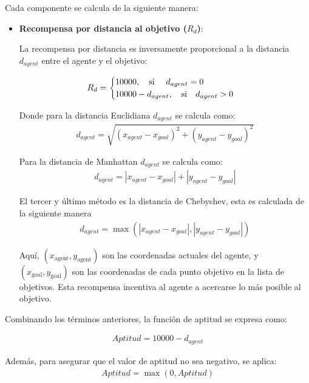 \documentclass[conference]{IEEEtran}
\begin{document}
Cada componente se calcula de la siguiente manera:

 \begin{itemize}
     \item \textbf{Recompensa por distancia al objetivo ($R_d$)}:

La recompensa por distancia es inversamente proporcional a la distancia $d_{agent}$ entre el agente y el objetivo:

\begin{align*} 
R_d = \begin{cases} 
10000, \quad \text{si } \quad d_{agent} = 0 
\cr 10000-d_{agent}, \quad \text{si} \quad d_{agent} > 0 
\end{cases} 
\end{align*}

Donde para la distancia Euclidiana $d_{agent}$ se calcula como:
\begin{align*} 
    d_{agent} = {\sqrt{(x_{agent} - x_{goal})^2 + (y_{agent} - y_{goal})^2}} 
\end{align*}

Para la distancia de Manhattan $d_{agent}$ se calcula como:
\begin{align*} 
    d_{agent} = |x_{agent} - x_{goal}| + |y_{agent} - y_{goal}|
\end{align*}

El tercer y último método es la distancia de Chebyshev, esta es calculada de la siguiente manera 
\begin{align*} 
    d_{agent} = \max(|x_{agent} - x_{goal}|, |y_{agent} - y_{goal}|)
\end{align*}



Aquí, $(x_{\text{agent}}, y_{\text{agent}})$ son las coordenadas actuales del agente, y $(x_{\text{goal}}, y_{\text{goal}})$ son las coordenadas de cada punto objetivo en la lista de objetivos. Esta recompensa incentiva al agente a acercarse lo más posible al objetivo.
\end{itemize}

Combinando los términos anteriores, la función de aptitud se expresa como:

\begin{align*} 
Aptitud = 10000 - d_{agent} 
\end{align*}

Además, para asegurar que el valor de aptitud no sea negativo, se aplica:
\begin{align*} 
Aptitud = \max(0, Aptitud) 
\end{align*}
\end{document}
